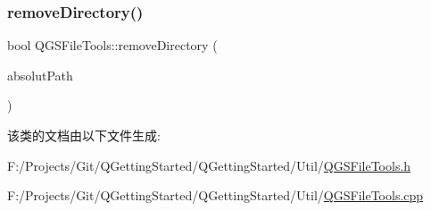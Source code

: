 \mbox{\label{class_q_g_s_file_tools_a72117ea1162c9826f802a8de7424abb4}} 
\subsubsection{\texorpdfstring{remove\+Directory()}{removeDirectory()}}
{\footnotesize\ttfamily bool Q\+G\+S\+File\+Tools\+::remove\+Directory (\begin{DoxyParamCaption}\item[{const Q\+String \&}]{absolut\+Path }\end{DoxyParamCaption})\hspace{0.3cm}{\ttfamily [static]}}



该类的文档由以下文件生成\+:\begin{DoxyCompactItemize}
\item 
F\+:/\+Projects/\+Git/\+Q\+Getting\+Started/\+Q\+Getting\+Started/\+Util/\mbox{\hyperlink{_q_g_s_file_tools_8h}{Q\+G\+S\+File\+Tools.\+h}}\item 
F\+:/\+Projects/\+Git/\+Q\+Getting\+Started/\+Q\+Getting\+Started/\+Util/\mbox{\hyperlink{_q_g_s_file_tools_8cpp}{Q\+G\+S\+File\+Tools.\+cpp}}\end{DoxyCompactItemize}
